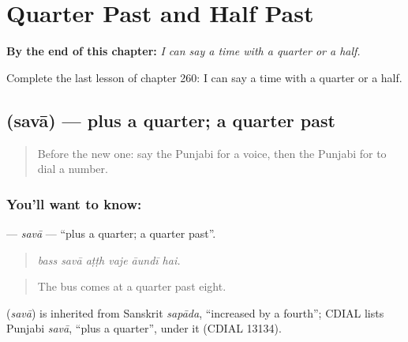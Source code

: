 
\chapter{Quarter Past and Half Past}
\label{ch:pa-a2-quarter-past-and-half-past}

\begin{chapteropening}
\textbf{By the end of this chapter:} \emph{I can say a time with a quarter or a half.}

Complete the last lesson of chapter 260: I can say a time with a quarter or a half.
\end{chapteropening}

\section[\texorpdfstring{\pa{ਸਵਾ} (savā)}{ਸਵਾ (savā)}]{ (savā) — plus a quarter; a quarter past}

\label{lesson:PA-C260-sava}



\begin{quote}
Before the new one: say the Punjabi for a voice, then the Punjabi for to dial a number.
\end{quote}

\subsection*{You'll want to know: }
\textbf{} — \emph{savā} — \textquotedblleft{}plus a quarter; a quarter past\textquotedblright{}.

\begin{quote}
     
\end{quote}

\begin{quote}
\emph{bass savā aṭṭh vaje āundī hai.}
\end{quote}

\begin{quote}
The bus comes at a quarter past eight.
\end{quote}

\begin{cousinweb}
\textbf{} (\emph{savā}) is inherited from Sanskrit \emph{sapāda}, \textquotedblleft{}increased by a fourth\textquotedblright{}; CDIAL lists Punjabi \emph{savā}, \textquotedblleft{}plus a quarter\textquotedblright{}, under it (CDIAL 13134).
\end{cousinweb}

